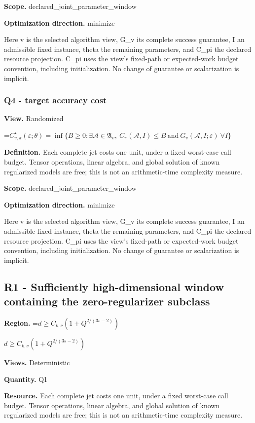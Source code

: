 \documentclass[10pt,a4paper]{article}
\newcommand{\AtlasMath}[1]{\par\begingroup\centering\setbox0=\hbox{$\displaystyle #1$}\ifdim\wd0>1.4\linewidth\typeout{ATLAS WIDE FORMULA: \the\wd0}\fi\ifdim\wd0>\linewidth\resizebox{\linewidth}{!}{\box0}\else\box0\fi\par\endgroup}
\newcommand{\AtlasInlineMath}[1]{\begingroup\setbox0=\hbox{$#1$}\ifdim\wd0>.4\linewidth\endgroup\AtlasMath{#1}\else\endgroup$#1$\fi}
\begin{document}
\textbf{Scope.} declared\_joint\_parameter\_window

\textbf{Optimization direction.} minimize

Here v is the selected algorithm view, G\_v its complete success guarantee, I an admissible fixed instance, theta the remaining parameters, and C\_pi the declared resource projection. C\_pi uses the view's fixed-path or expected-work budget convention, including initialization. No change of guarantee or scalarization is implicit.

\subsubsection{Q4 - target accuracy cost}
\textbf{View.} Randomized

\AtlasMath{C^\star_{v,\pi}(\varepsilon;\theta)=\inf\{B\ge0:\exists\mathcal A\in\mathfrak A_v,\ C_\pi(\mathcal A,I)\le B\ \text{and}\ G_v(\mathcal A,I;\varepsilon)\ \forall I\}}
\textbf{Definition.} Each complete jet costs one unit, under a fixed worst-case call budget. Tensor operations, linear algebra, and global solution of known regularized models are free; this is not an arithmetic-time complexity measure.

\textbf{Scope.} declared\_joint\_parameter\_window

\textbf{Optimization direction.} minimize

Here v is the selected algorithm view, G\_v its complete success guarantee, I an admissible fixed instance, theta the remaining parameters, and C\_pi the declared resource projection. C\_pi uses the view's fixed-path or expected-work budget convention, including initialization. No change of guarantee or scalarization is implicit.

\subsection{R1 - Sufficiently high-dimensional window containing the zero-regularizer subclass}
\textbf{Region.} \AtlasInlineMath{d\ge C_{k,\nu}(1+Q^{2/(3s-2)})}

\textbf{Views.} Deterministic

\textbf{Quantity.} Q1

\textbf{Resource.} Each complete jet costs one unit, under a fixed worst-case call budget. Tensor operations, linear algebra, and global solution of known regularized models are free; this is not an arithmetic-time complexity measure.
\end{document}
